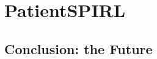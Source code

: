 \newpage


\newpage


\newpage


\newpage


\newpage


\part{PatientSPIRL}
\label{part:patientspirl}

\newpage


\newpage
\chapter{Conclusion: the Future}
\label{ch:conclusion}


\printbibliography


